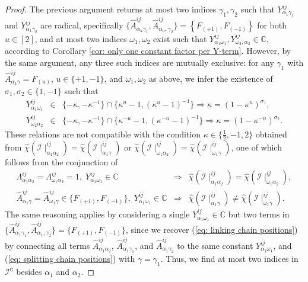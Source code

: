 \documentclass[10pt]{article}
\theoremstyle{remark}%
\theoremstyle{definition}%
\begin{document}
\begin{proof}
The previous argument returns at most two indices $\gamma_{1},\gamma_{2}$ such that $Y_{\alpha_{1}\gamma_{1}}^{ij}$ and $Y_{\alpha_{1}\gamma_{2}}^{ij}$ are radical, specifically $\{\hat{A}_{\alpha_{u}\gamma_{1}}^{ij},\hat{A}_{\alpha_{u},\gamma_{2}}^{ij}\}=\left\{F_{(+1)},F_{(-1)}\right\}$ for both $u\in[2]$, and at most two indices $\omega_{1},\omega_{2}$ exist such that $Y_{\alpha_{1}\omega_{1}}^{ij},Y_{\omega_{2},\alpha_{2}}^{ij}\in\mathbb{C}$, according to Corollary \ref{cor: only one constant factor per Y-term}. However, by the same argument, any three such indices are mutually exclusive: for any $\gamma_{1}$ with $\hat{A}_{\alpha_{1}\gamma}^{ij}=F_{(u)}$, $u\in\{+1,-1\}$, and $\omega_{1},\omega_{2}$ as above, we infer the existence of $\sigma_{1},\sigma_{2}\in\{1,-1\}$ such that
\begin{eqnarray}
Y_{\alpha_{1}\omega_{1}}^{ij} & \in & \{-\kappa,-\kappa^{-1}\}\cap\{\kappa^{u}-1,(\kappa^{u}-1)^{-1}\} \Rightarrow  \kappa=(1-\kappa^{u})^{\sigma_{1}},\nonumber \\
Y_{\omega_{2}\alpha_{2}}^{ij} & \in & \{-\kappa,-\kappa^{-1}\}\cap\{\kappa^{-u}-1,(\kappa^{-u}-1)^{-1}\} \Rightarrow \kappa=(1-\kappa^{-u})^{\sigma_{2}}.
\label{eq: linking chain positions}
\end{eqnarray}
These relations are not compatible with the condition $\kappa\in\{\frac{1}{2},-1,2\}$ obtained from $\hat{\chi}(\mathcal{I}\mid_{\alpha_{1}\alpha_{2}}^{ij})=\hat{\chi}(\mathcal{I}\mid_{\alpha_{1}\gamma}^{ij})$ or $\hat{\chi}(\mathcal{I}\mid_{\omega_{1}\alpha_{2}}^{ij})=\hat{\chi}(\mathcal{I}\mid_{\omega_{1}\gamma}^{ij})$, one of which follows from the conjunction of 
\begin{eqnarray} 
\Lambda_{\alpha_{1}\alpha_{2}}^{ij}=\Lambda_{\omega_{1}\alpha_{2}}^{ij}=1,\; Y_{\alpha_{1}\omega_{1}}^{ij}\in\mathbb{C}  & \Rightarrow & \hat{\chi}(\mathcal{I}\mid_{\alpha_{1}\alpha_{2}}^{ij})=\hat{\chi}(\mathcal{I}\mid_{\omega_{1}\alpha_{2}}^{ij}),\nonumber \\ 
\hat{A}_{\alpha_{1}\gamma}^{ij}=\hat{A}_{\omega_{1}\gamma}^{ij}\in\{F_{(+1)},F_{(-1)}\},\; Y_{\alpha_{1}\omega_{1}}^{ij}\in\mathbb{C} & \Rightarrow &
\hat{\chi}(\mathcal{I}\mid_{\alpha_{1}\gamma}^{ij})\neq\hat{\chi}(\mathcal{I}\mid_{\omega_{1}\gamma}^{ij}).
\label{eq: splitting chain positions}
\end{eqnarray}
The same reasoning applies by considering a single $Y_{\alpha_{1}\omega_{1}}^{ij}\in\mathbb{C}$ but two terms in $\{\hat{A}_{\alpha_{1}\gamma_{1}}^{ij},\hat{A}_{\alpha_{1},\gamma_{2}}^{ij}\}=\{F_{(+1)},F_{(-1)}\}$, since we recover (\ref{eq: linking chain positions}) by connecting all terms $\hat{A}_{\alpha_{1}\alpha_{2}}^{ij}$, $\hat{A}_{\alpha_{1}\gamma_{1}}^{ij}$, and $\hat{A}_{\alpha_{1}\gamma_{2}}^{ij}$ to the same constant $Y_{\alpha_{1}\omega_{1}}^{ij}$, and (\ref{eq: splitting chain positions}) with $\gamma=\gamma_{1}$. Thus, we find at most two indices in $\mathcal{I}^{\mathtt{C}}$ besides $\alpha_{1}$ and $\alpha_{2}$. 
\end{proof}
\end{document}
